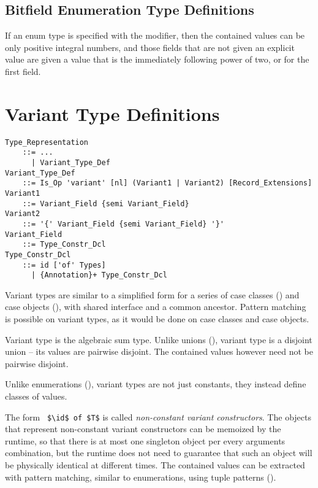\subsection{Bitfield Enumeration Type Definitions}

If an enum type is specified with the  modifier, then the contained values can be only positive integral numbers, and those fields that are not given an explicit value are given a value that is the immediately following power of two, or  for the first field. 





\section{Variant Type Definitions}
\label{sec:variant-types}

\grammar\begin{lstlisting}
Type_Representation
    ::= ...
      | Variant_Type_Def
Variant_Type_Def
    ::= Is_Op 'variant' [nl] (Variant1 | Variant2) [Record_Extensions]
Variant1 
    ::= Variant_Field {semi Variant_Field}
Variant2 
    ::= '{' Variant_Field {semi Variant_Field} '}'
Variant_Field
    ::= Type_Constr_Dcl
Type_Constr_Dcl
    ::= id ['of' Types]
      | {Annotation}+ Type_Constr_Dcl
\end{lstlisting}

Variant types are similar to a simplified form for a series of case classes () and case objects (), with shared interface and a common ancestor. Pattern matching is possible on variant types, as it would be done on case classes and case objects. 

Variant type is the algebraic sum type. Unlike unions (), variant type is a disjoint union -- its values are pairwise disjoint. The contained values however need not be pairwise disjoint. 

Unlike enumerations (), variant types are not just constants, they instead define classes of values. 

The form ~\lstinline!$\id$ of $T$! is called {\em non-constant variant constructors}. The objects that represent non-constant variant constructors can be memoized by the runtime, so that there is at most one singleton object per every arguments combination, but the runtime does not need to guarantee that such an object will be physically identical at different times. The contained values can be extracted with pattern matching, similar to enumerations, using tuple patterns (). 

